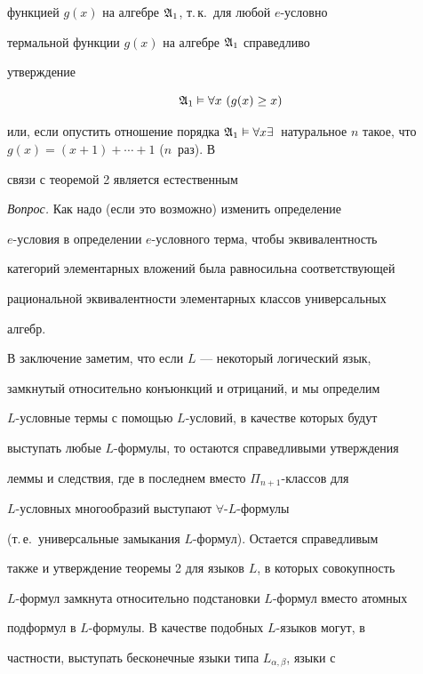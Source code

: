 функцией $g(x)$ на алгебре $\frak A_1$, т.\,к.~для любой $e$-условно 


термальной функции $g(x)$ на алгебре $\frak A_1$ справедливо 


утверждение 


$$ 


\frak A_1\vDash\forall x\ (g(x)\ge x) 


$$ 


или, если опустить отношение порядка $\frak A_1\vDash\forall 


x\exists$~натуральное $n$ такое, что $g(x)=(x+1)+\dotsb+1$ ($n$~раз). В 


связи с теоремой 2 является естественным 


\medskip 


 


{\it Вопрос.} Как надо (если это возможно) изменить определение 


$e$-условия в определении $e$-условного терма, чтобы эквивалентность 


категорий элементарных вложений была равносильна соответствующей 


рациональной эквивалентности элементарных классов универсальных 


алгебр. 


\medskip 


 


В заключение заметим, что если $L$ --- некоторый логический язык, 


замкнутый относительно конъюнкций и отрицаний, и мы определим 


$L$-условные термы с помощью $L$-условий, в качестве которых будут 


выступать любые $L$-формулы, то остаются справедливыми утверждения 


леммы и следствия, где в последнем вместо $\Pi_{n+1}$-классов для 


$L$-условных многообразий выступают $\forall$-$L$-формулы 


(т.\,е.~универсальные замыкания $L$-формул). Остается справедливым 


также и утверждение теоремы 2 для языков $L$, в которых совокупность 


$L$-формул замкнута относительно подстановки $L$-формул вместо атомных 


подформул в $L$-формулы. В качестве подобных $L$-языков могут, в 


частности, выступать бесконечные языки типа $L_{\alpha,\beta}$, языки с 


